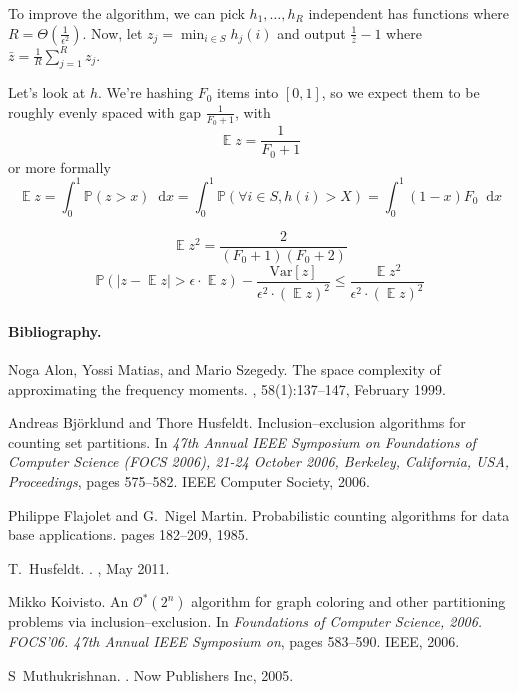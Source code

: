 \documentclass[11pt]{article}
\DeclareMathOperator*{\E}{\mathbb{E}}
\renewcommand{\P}{\mathbb{P}}
\newcommand\dif{\mathop{}\!\mathrm{d}}
\newcommand{\Oh}{\mathcal{O}}
\newcommand{\ohstar}{\Oh^\ast}
\newcommand{\Var}{\mathrm{Var}}
\begin{document}
To improve the algorithm, we can pick $h_1, \ldots, h_R$ independent has functions where $R = \Theta(\frac{1}{\epsilon^2})$.
Now, let $z_j = \min_{i \in S} h_j(i)$ and output $\frac{1}{\bar{z}} - 1$ where $\bar{z} = \frac{1}{R} \sum_{j=1}^R z_j$.

Let's look at $h$. We're hashing $F_0$ items into $[0,1]$, so we expect them to be roughly evenly spaced with gap $\frac{1}{F_0 + 1}$, with 
\[
\E z = \frac{1}{F_0 + 1}
\]
or more formally
\[
\E z = \int_0^1 \P(z > x) \dif x = \int_0^1 \P(\forall i \in S, h(i) > X) = \int_0^1 (1-x)F_0 \dif x
\]

\[
\E z^2 = \frac{2}{(F_0 + 1)(F_0 + 2)}
\]\[
\P(| z - \E z | > \epsilon \cdot \E z) - \frac{\Var[z]}{\epsilon^2 \cdot (\E z)^2} \leq \frac{\E z^2}{\epsilon^2 \cdot (\E z)^2}
\]

\paragraph{Bibliography.}



\begin{thebibliography}{{Hus}11}

Noga Alon, Yossi Matias, and Mario Szegedy.
\newblock The space complexity of approximating the frequency moments.
, 58(1):137--147, February 1999.

Andreas Bj{\"{o}}rklund and Thore Husfeldt.
\newblock Inclusion--exclusion algorithms for counting set partitions.
\newblock In {\em 47th Annual {IEEE} Symposium on Foundations of Computer
  Science {(FOCS} 2006), 21-24 October 2006, Berkeley, California, USA,
  Proceedings}, pages 575--582. {IEEE} Computer Society, 2006.

Philippe Flajolet and G.~Nigel Martin.
\newblock Probabilistic counting algorithms for data base applications.
\newblock pages 182--209, 1985.

T.~{Husfeldt}.
.
, May 2011.

Mikko Koivisto.
\newblock An $\ohstar(2^n)$ algorithm for graph coloring and other partitioning
  problems via inclusion--exclusion.
\newblock In {\em Foundations of Computer Science, 2006. FOCS'06. 47th Annual
  IEEE Symposium on}, pages 583--590. IEEE, 2006.

S~Muthukrishnan.
.
\newblock Now Publishers Inc, 2005.

\end{thebibliography}
\end{document}
